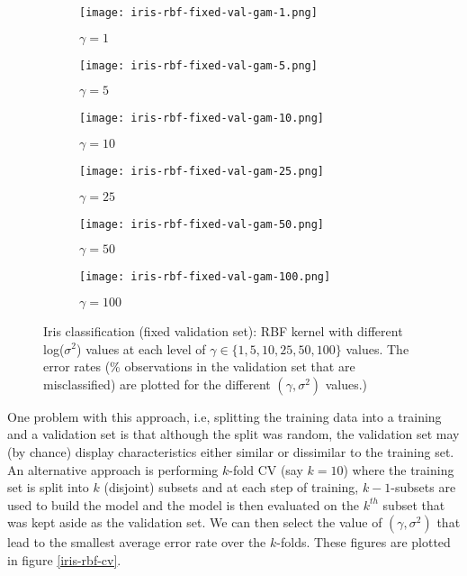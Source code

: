 \documentclass[paper=a4, fontsize=11pt]{scrartcl} %
\numberwithin{equation}{section} %
\begin{document}
\begin{figure}[ht]
\centering
	\begin{subfigure}[b]{0.3\textwidth}
		\centering
		\texttt{[image: iris-rbf-fixed-val-gam-1.png]}
		\caption{$\gamma = 1$}
	\end{subfigure}%
	\begin{subfigure}[b]{0.3\textwidth}
		\centering
		\texttt{[image: iris-rbf-fixed-val-gam-5.png]}
		\caption{$\gamma = 5$}
	\end{subfigure}%
	\begin{subfigure}[b]{0.3\textwidth}
		\centering
		\texttt{[image: iris-rbf-fixed-val-gam-10.png]}
		\caption{$\gamma = 10$}
	\end{subfigure}
		\begin{subfigure}[b]{0.3\textwidth}
		\centering
		\texttt{[image: iris-rbf-fixed-val-gam-25.png]}
		\caption{$\gamma = 25$}
	\end{subfigure}%
	\begin{subfigure}[b]{0.3\textwidth}
		\centering
		\texttt{[image: iris-rbf-fixed-val-gam-50.png]}
		\caption{$\gamma = 50$}
	\end{subfigure}%
	\begin{subfigure}[b]{0.3\textwidth}
		\centering
		\texttt{[image: iris-rbf-fixed-val-gam-100.png]}
		\caption{$\gamma = 100$}
	\end{subfigure}
\caption{Iris classification (fixed validation set): RBF kernel with different log($\sigma^2$) values at each level of $\gamma \in \{1,5,10,25,50,100\}$ values. The error rates (\% observations in the validation set that are misclassified) are plotted for the different $(\gamma, \sigma^2)$ values.)}
\label{iris-rbf-fixed-val}
\end{figure}

One problem with this approach, i.e, splitting the training data into a training and a validation set is that although the split was random, the validation set may (by chance) display characteristics either similar or dissimilar to the training set. An alternative approach is performing $k$-fold CV (say $k=10$) where the training set is split into $k$ (disjoint) subsets and at each step of training, $k-1$-subsets are used to build the model and the model is then evaluated on the $k^{th}$ subset that was kept aside as the validation set. We can then select the value of $(\gamma, \sigma^2)$ that lead to the smallest average error rate over the $k$-folds. These figures are plotted in figure \ref{iris-rbf-cv}.\\
\end{document}
